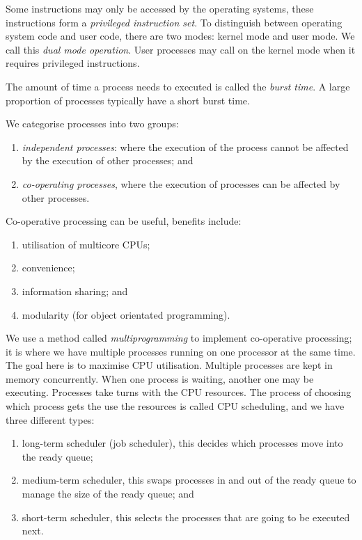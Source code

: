 Some instructions may only be accessed by the operating systems,
these instructions form a \emph{privileged instruction set}.
To distinguish between operating system code and user code, there are two 
modes: kernel mode and user mode. We call this \emph{dual mode operation}.
User processes may call on the kernel mode when it requires privileged
instructions.

The amount of time a process needs to executed is called the \emph{burst time}.
A large proportion of processes typically have a short burst time.

We categorise processes into two groups:
\begin{enumerate}
	\item \emph{independent processes}: where the execution of the process cannot
	be affected by the execution of other processes; and
	\item \emph{co-operating processes}, where the execution of processes can be
	affected by other processes.
\end{enumerate}

Co-operative processing can be useful, benefits include:
\begin{enumerate}
	\item utilisation of multicore CPUs;
	\item convenience;
	\item information sharing; and
	\item modularity (for object orientated programming).
\end{enumerate}

We use a method called \emph{multiprogramming} to implement
co-operative processing; it is where we have multiple processes running on one
processor at the same time. The goal here is to maximise CPU utilisation.
Multiple processes are kept in memory concurrently.
When one process is waiting, another one may be executing.
Processes take turns with the CPU resources.
The process of choosing which process gets the use the resources is called
CPU scheduling, and we have three different types:
\begin{enumerate}
	\item long-term scheduler (job scheduler), this decides which
	processes move into the ready queue;
	\item medium-term scheduler, this swaps processes in and out of the ready
	queue to manage the size of the ready queue; and
	\item short-term scheduler, this selects the processes that are going
	to be executed next.
\end{enumerate}

